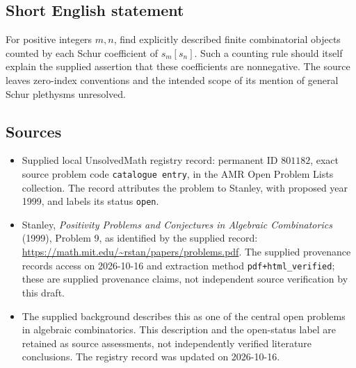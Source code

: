\documentclass[11pt]{article}
\begin{document}
\subsection{Short English statement}
For positive integers \(m,n\), find explicitly described finite combinatorial objects counted by each Schur coefficient of \(s_m[s_n]\). Such a counting rule should itself explain the supplied assertion that these coefficients are nonnegative. The source leaves zero-index conventions and the intended scope of its mention of general Schur plethysms unresolved.
\subsection{Sources}
\begin{itemize}
\item Supplied local UnsolvedMath registry record: permanent ID \(801182\), exact source problem code \texttt{catalogue entry}, in the AMR Open Problem Lists collection. The record attributes the problem to Stanley, with proposed year 1999, and labels its status \texttt{open}.
\item Stanley, \emph{Positivity Problems and Conjectures in Algebraic Combinatorics} (1999), Problem 9, as identified by the supplied record: \url{https://math.mit.edu/~rstan/papers/problems.pdf}. The supplied provenance records access on 2026-10-16 and extraction method \texttt{pdf+html\_verified}; these are supplied provenance claims, not independent source verification by this draft.
\item The supplied background describes this as one of the central open problems in algebraic combinatorics. This description and the open-status label are retained as source assessments, not independently verified literature conclusions. The registry record was updated on 2026-10-16.
\end{itemize}
\end{document}
